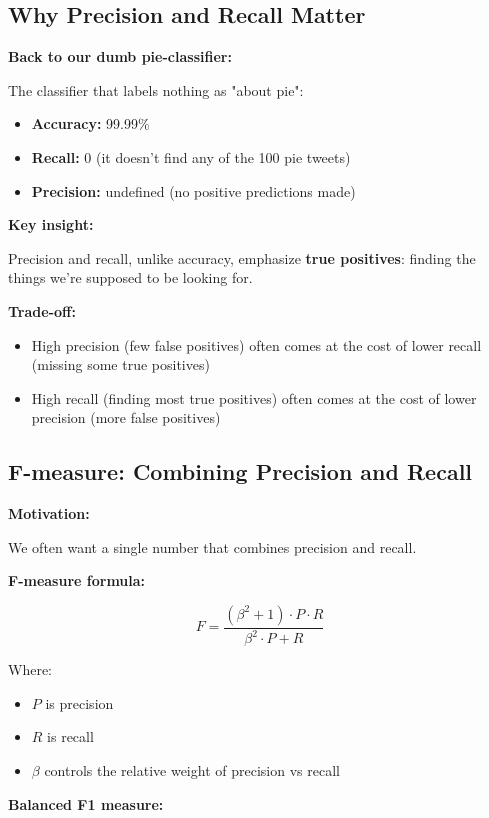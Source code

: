 \documentclass[11pt,a4paper]{article}
\theoremstyle{definition}
\theoremstyle{plain}
\theoremstyle{remark}
\begin{document}
\subsection{Why Precision and Recall Matter}

\textbf{Back to our dumb pie-classifier:}

The classifier that labels nothing as "about pie":
\begin{itemize}
    \item \textbf{Accuracy:} 99.99\%
    \item \textbf{Recall:} 0 (it doesn't find any of the 100 pie tweets)
    \item \textbf{Precision:} undefined (no positive predictions made)
\end{itemize}

\textbf{Key insight:}

Precision and recall, unlike accuracy, emphasize \textbf{true positives}: finding the things we're supposed to be looking for.

\textbf{Trade-off:}
\begin{itemize}
    \item High precision (few false positives) often comes at the cost of lower recall (missing some true positives)
    \item High recall (finding most true positives) often comes at the cost of lower precision (more false positives)
\end{itemize}

\subsection{F-measure: Combining Precision and Recall}

\textbf{Motivation:}

We often want a single number that combines precision and recall.

\textbf{F-measure formula:}

\[
F = \frac{(\beta^2 + 1) \cdot P \cdot R}{\beta^2 \cdot P + R}
\]

Where:
\begin{itemize}
    \item $P$ is precision
    \item $R$ is recall
    \item $\beta$ controls the relative weight of precision vs recall
\end{itemize}

\textbf{Balanced F1 measure:}
\end{document}
